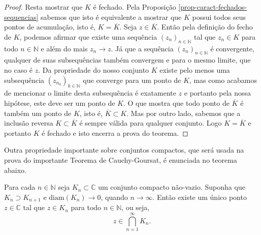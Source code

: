 \begin{proof}
Resta mostrar que $K$ é fechado. Pela Proposição \ref{prop-caract-fechados-sequencias} 
sabemos que isto é equivalente a mostrar que $K$ possui todos seus pontos de acumulação,
isto é, $K=\overline{K}$. 
Seja $z\in \overline{K}$. Então pela definição do fecho de $K$, podemos afirmar que 
existe uma sequência $(z_n)_{n\in\mathbb{N}}$ tal que $z_n\in K$ para todo $n\in\mathbb{N}$ 
e além do mais $z_n\to z$. Já que a sequência $(z_n)_{n\in\mathbb{N}}$ é convergente, qualquer
de suas subsequências também convergem e para o mesmo limite, que no caso é $z$.
Da propriedade do nosso conjunto $K$ existe pelo menos uma subsequência 
$(z_{n_{k}})_{k\in\mathbb{N}}$
que converge para um ponto de $K$, mas como acabamos de mencionar o limite desta subsequência é 
exatamente $z$ e portanto pela nossa hipótese, este deve ser um ponto de $K$. O que mostra que 
todo ponto de $\overline{K}$ é também um ponto de $K$, isto é, $\overline{K}\subset K$.
Mas por outro lado, sabemos que a inclusão reversa $K\subset \overline{K}$ é sempre válida para qualquer 
conjunto. Logo $K=\overline{K}$ e portanto $K$ é fechado e isto encerra a prova do teorema.
\end{proof}



Outra propriedade importante sobre conjuntos compactos, que será usada na prova do importante
Teorema de Cauchy-Goursat, é enunciada no teorema abaixo. 

\begin{teorema}
Para cada $n\in\mathbb{N}$ seja $K_n\subset \mathbb{C}$ um conjunto compacto não-vazio. Suponha que $K_{n}\supset K_{n+1}$ e $\mathrm{diam}(K_n)\to 0$, quando $n\to\infty$. Então existe um único ponto $z\in\mathbb{C}$ tal que $z\in K_n$ para todo $n\in\mathbb{N}$, ou seja, 
\[
z\in \bigcap_{n=1}^{\infty} K_n.
\]


\end{teorema}


